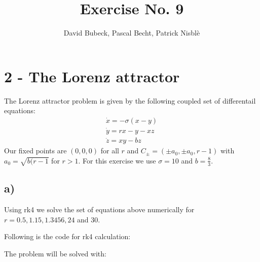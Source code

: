 \documentclass[11pt, a4paper, reqno]{scrartcl}
\begin{document}
    \title{Exercise No. 9}
    \author{David Bubeck, Pascal Becht, Patrick Nisbl\`e}
    \maketitle


    \section{2 - The Lorenz attractor}
   
    	The Lorenz attractor problem is given by the following coupled set of 				differentail equations:
    	\begin{align}
    		\dot{x} = -\sigma (x - y) \\
    		\dot{y} = rx - y - xz \\
    		\dot{z} = xy - bz
    	\end{align}
    	Our fixed points are $(0, 0, 0)$ for all $r$ and $C_{\pm} = (\pm a_0, \pm 			a_0, r - 1)$ with $a_0 = \sqrt{b(r - 1}$ for $r > 1$. For this exercise we 			use $\sigma = 10$ and $b = \frac{8}{3}$.
    
     \subsection*{a)}
     	Using rk4 we solve the set of equations above numerically for $r = 0.5, 			1.15, 1.3456, 24$ and $30$.
     	
     	Following is the code for rk4 calculation:
     	\begin{figure}[H]
     		
     	\end{figure}
     	
     	The problem will be solved with:
     	\begin{figure}[H]
     		
     	\end{figure}
    
\end{document}
